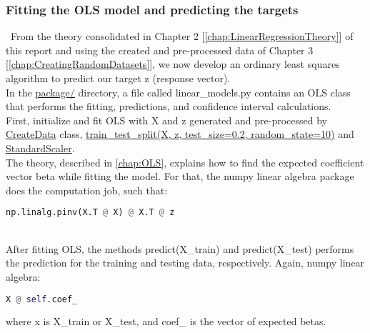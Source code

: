 \subsubsection{Fitting the OLS model and predicting the targets}
\label{chap:Fitting the OLS model and predicting the targets}

\quad \, From the theory consolidated in Chapter 2 [\autoref{chap:LinearRegressionTheory}] of this report and using the created and pre-processed data of Chapter 3 [\autoref{chap:CreatingRandomDatasets}], we now develop an ordinary least squares algorithm to predict our target z (response vector).\\

In the \href{https://github.com/fabiorodp/UiO-FYS-STK4155/tree/master/Project1/package}{package/} directory, a file called linear\_models.py contains an OLS class that performs the fitting, predictions, and confidence interval calculations.\\

First, initialize and fit OLS with X and z generated and pre-processed by \href{https://github.com/fabiorodp/UiO-FYS-STK4155/tree/master/Project1/package}{CreateData} class, \href{https://scikit-learn.org/stable/modules/generated/sklearn.model_selection.train_test_split.html}{train\_test\_split(X, z, test\_size=0.2, random\_state=10)} and \href{https://scikit-learn.org/stable/modules/generated/sklearn.preprocessing.StandardScaler.html}{StandardScaler}.\\

The theory, described in \autoref{chap:OLS}, explains how to find the expected coefficient vector beta while fitting the model. For that, the numpy linear algebra package does the computation job, such that:\\

\begin{lstlisting}[language=Python]
    np.linalg.pinv(X.T @ X) @ X.T @ z
\end{lstlisting}\\

After fitting OLS, the methods predict(X\_train) and predict(X\_test) performs the prediction for the training and testing data, respectively. Again, numpy linear algebra:\\

\begin{lstlisting}[language=Python]
    X @ self.coef_
\end{lstlisting}
where x is X\_train or X\_test, and coef\_ is the vector of expected betas.\\

